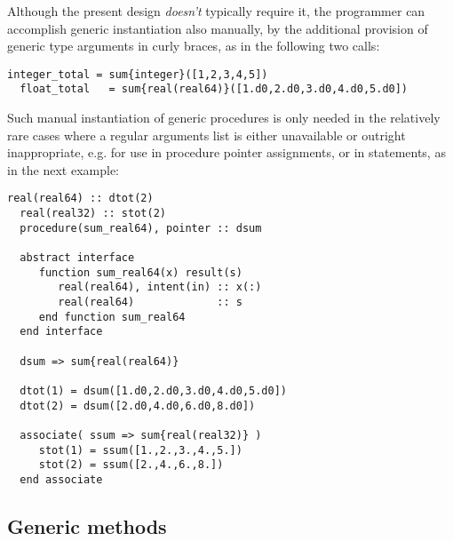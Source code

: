 \documentclass[11pt,oneside]{report}
\newcommand{\code}[1]{{\selectfont\ttfamily{#1}}}
\begin{document}
Although the present design \emph{doesn't} typically require it, the
programmer can accomplish generic instantiation also manually, by the
additional provision of generic type arguments in curly braces, as in
the following two calls:
\begin{lstlisting}[language=LFortran,style=boxed]
  integer_total = sum{integer}([1,2,3,4,5])
  float_total   = sum{real(real64)}([1.d0,2.d0,3.d0,4.d0,5.d0])
\end{lstlisting}
Such manual instantiation of generic procedures is only needed in
the relatively rare cases where a regular arguments list is either
unavailable or outright inappropriate, e.g. for use in procedure
pointer assignments, or in \code{associate} statements, as in the next
example:
\begin{lstlisting}[language=LFortran,style=boxed]
  real(real64) :: dtot(2)
  real(real32) :: stot(2)
  procedure(sum_real64), pointer :: dsum

  abstract interface
     function sum_real64(x) result(s)
        real(real64), intent(in) :: x(:)
        real(real64)             :: s
     end function sum_real64  
  end interface
  
  dsum => sum{real(real64)}

  dtot(1) = dsum([1.d0,2.d0,3.d0,4.d0,5.d0])
  dtot(2) = dsum([2.d0,4.d0,6.d0,8.d0])

  associate( ssum => sum{real(real32)} )
     stot(1) = ssum([1.,2.,3.,4.,5.])
     stot(2) = ssum([2.,4.,6.,8.])     
  end associate
\end{lstlisting}

\subsection{Generic methods}
\label{sect:generic_methods}
\end{document}
